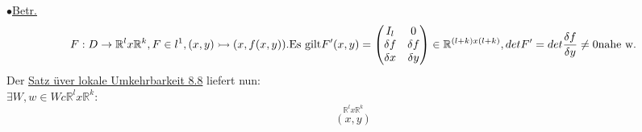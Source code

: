 \documentclass[]{scrartcl}
\begin{document}
	$\bullet$\underline{Betr.}\begin{equation}
		F: D \rightarrow \mathbb{R}^lx\mathbb{R}^k, F\in l^1, (x,y)\rightarrowtail (x,f(x,y)).\\
		\text{Es gilt} F'(x,y)= \begin{pmatrix}
			I_l & 0\\
			\delta f & \delta f\\
			\delta x & \delta y
		\end{pmatrix} \in \mathbb{R}^{(l+k)x(l+k)}, det F' = det \frac{\delta f}{\delta y}\neq 0 \text{nahe w}.
	\end{equation}
	Der \ul{Satz üver lokale Umkehrbarkeit 8.8} liefert nun:\\
	$\exists W,w \in W c  \mathbb{R}^lx\mathbb{R}^k:$\\
	\begin{equation}
		\stackrel{\mathbb{R}^lx\mathbb{R}^k}{(x,y)}
	\end{equation}
	
	
\end{document}
